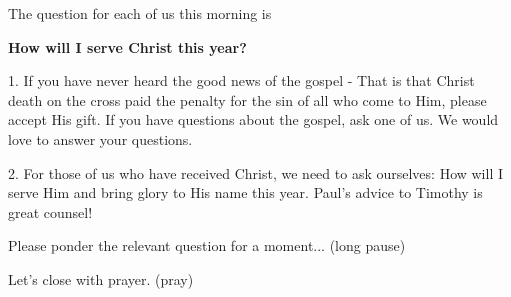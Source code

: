 \documentclass[12pt]{article} %
\begin{document}
The question for each of us this morning is

\textbf{How will I serve Christ this year?}

1. If you have never heard the good news of the gospel - That is that Christ
death on the cross paid the penalty for the sin of all who come to Him, please
accept His gift. If you have questions about the gospel, ask one of us. We would
love to answer your questions.

2. For those of us who have received Christ, we need to ask ourselves:
How will I serve Him and bring glory to His name this year. Paul's
advice to Timothy is great counsel!

Please ponder the relevant question for a moment... (long pause)

Let's close with prayer. (pray)



\end{document}
